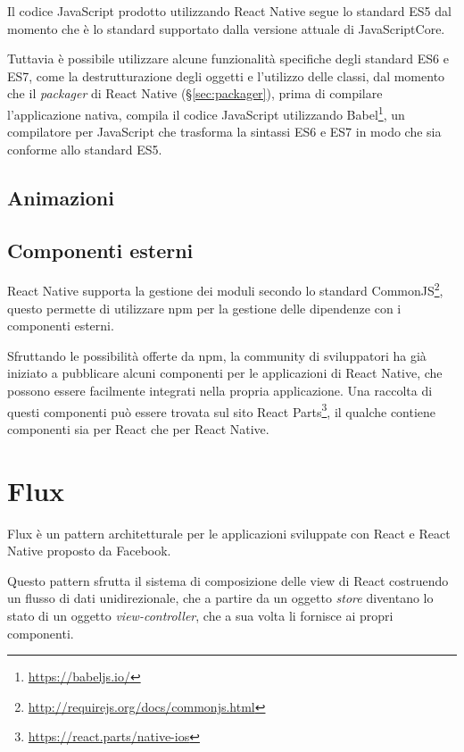 Il codice JavaScript prodotto utilizzando React Native segue lo standard ES5 dal momento che è lo standard supportato dalla versione attuale di JavaScriptCore.

Tuttavia è possibile utilizzare alcune funzionalità specifiche degli standard ES6 e ES7, come la destrutturazione degli oggetti e l'utilizzo delle classi, dal momento che il \textit{packager} di React Native (§\ref{sec:packager}), prima di compilare l'applicazione nativa, compila il codice JavaScript utilizzando Babel\footnote{\url{https://babeljs.io/}}, un compilatore per JavaScript che trasforma la sintassi ES6 e ES7 in modo che sia conforme allo standard ES5.

\subsection{Animazioni}


\subsection{Componenti esterni}

React Native supporta la gestione dei moduli secondo lo standard CommonJS\footnote{\url{http://requirejs.org/docs/commonjs.html}}, questo permette di utilizzare npm per la gestione delle dipendenze con i componenti esterni.

Sfruttando le possibilità offerte da npm, la community di sviluppatori ha già iniziato a pubblicare alcuni componenti per le applicazioni di React Native, che possono essere facilmente integrati nella propria applicazione.
Una raccolta di questi componenti può essere trovata sul sito React Parts\footnote{\url{https://react.parts/native-ios}}, il qualche contiene componenti sia per React che per React Native.

\section{Flux}\label{sec:flux}
Flux è un pattern architetturale per le applicazioni sviluppate con React e React Native proposto da Facebook.

Questo pattern sfrutta il sistema di composizione delle view di React costruendo un flusso di dati unidirezionale, che a partire da un oggetto \textit{store} diventano lo stato di un oggetto \textit{view-controller}, che a sua volta li fornisce ai propri componenti.

